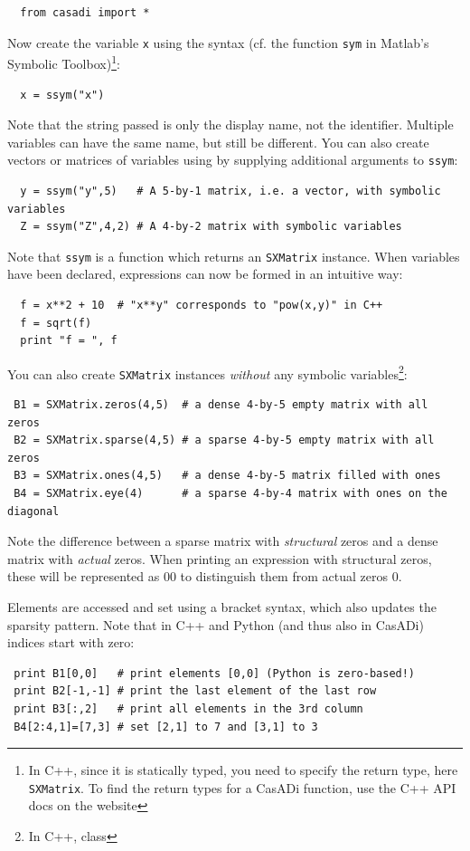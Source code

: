 \documentclass[a4paper,12pt]{book}
\begin{document}
{\begin{verbatim}
  from casadi import *
\end{verbatim}

Now create the variable \texttt{x} using the syntax (cf. the function \texttt{sym} in Matlab's Symbolic Toolbox)\footnote{In C++, since it is statically typed, you need to specify the return type, here \texttt{SXMatrix}. To find the return types for a CasADi function, use the C++ API docs on the website}:
\begin{verbatim}
  x = ssym("x")
\end{verbatim}
Note that the string passed is only the display name, not the identifier. Multiple variables can have the same name, but still be different. You can also create vectors or matrices of variables using by supplying additional arguments to \texttt{ssym}:
\begin{verbatim}
  y = ssym("y",5)   # A 5-by-1 matrix, i.e. a vector, with symbolic variables
  Z = ssym("Z",4,2) # A 4-by-2 matrix with symbolic variables
\end{verbatim}

Note that \texttt{ssym} is a function which returns an \texttt{SXMatrix} instance. When variables have been declared, expressions can now be formed in an intuitive way: 
\begin{verbatim}
  f = x**2 + 10  # "x**y" corresponds to "pow(x,y)" in C++
  f = sqrt(f)
  print "f = ", f
\end{verbatim}

You can also create \texttt{SXMatrix} instances \emph{without} any symbolic variables\footnote{In C++, class}:
\begin{verbatim}
 B1 = SXMatrix.zeros(4,5)  # a dense 4-by-5 empty matrix with all zeros
 B2 = SXMatrix.sparse(4,5) # a sparse 4-by-5 empty matrix with all zeros
 B3 = SXMatrix.ones(4,5)   # a dense 4-by-5 matrix filled with ones
 B4 = SXMatrix.eye(4)      # a sparse 4-by-4 matrix with ones on the diagonal
\end{verbatim}

Note the difference between a sparse matrix with \emph{structural} zeros and a dense matrix with \emph{actual} zeros. When printing an expression with structural zeros, these will be represented as $00$ to distinguish them from actual zeros $0$.

Elements are accessed and set using a bracket syntax, which also updates the sparsity pattern. Note that in C++ and Python (and thus also in CasADi) indices start with zero:
\begin{verbatim}
 print B1[0,0]   # print elements [0,0] (Python is zero-based!)
 print B2[-1,-1] # print the last element of the last row
 print B3[:,2]   # print all elements in the 3rd column
 B4[2:4,1]=[7,3] # set [2,1] to 7 and [3,1] to 3
\end{verbatim}

}
\end{document}
